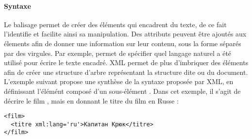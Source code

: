 
\paragraph{Syntaxe}
Le balisage permet de créer des éléments qui encadrent du texte, de ce fait l'identifie et facilite ainsi sa manipulation.
Des attributs peuvent être ajoutés aux élements afin de donner une information sur leur contenu, sous la forme  séparés par des virgules.
Par exemple,  permet de spécifier quel langage naturel a été utilisé pour écrire le texte encadré.
XML permet de plus d'imbriquer des éléments afin de créer une structure d'arbre représentant la structure dite  ou  du document.
L'exemple suivant propose une synthèse de la syntaxe proposée par XML, en définissant l'élémént  composé d'un sous-élément .
Dans cet exemple, il s'agit de décrire le film , mais en donnant le titre du film en Russe :
\begin{Verbatim}[fontsize=\small,formatcom=\color{black!70}]
<film>
  <titre xml:lang='ru'>Капитан Крюк</titre>
</film>
\end{Verbatim}


